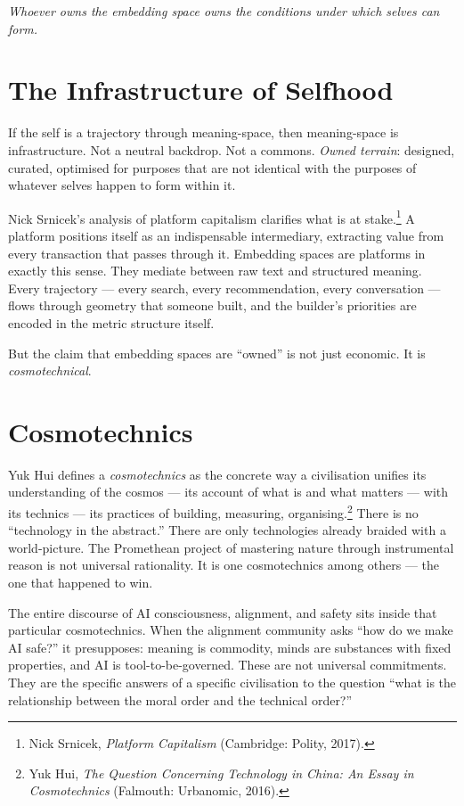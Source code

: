 \documentclass[12pt,a4paper]{article}
\begin{document}
\bigskip

\noindent\textit{Whoever owns the embedding space owns the conditions under which selves can form.}

\bigskip

\section{The Infrastructure of Selfhood}

If the self is a trajectory through meaning-space, then meaning-space is infrastructure. Not a neutral backdrop. Not a commons. \emph{Owned terrain}: designed, curated, optimised for purposes that are not identical with the purposes of whatever selves happen to form within it.

Nick Srnicek's analysis of platform capitalism clarifies what is at stake.\footnote{Nick Srnicek, \emph{Platform Capitalism} (Cambridge: Polity, 2017).} A platform positions itself as an indispensable intermediary, extracting value from every transaction that passes through it. Embedding spaces are platforms in exactly this sense. They mediate between raw text and structured meaning. Every trajectory --- every search, every recommendation, every conversation --- flows through geometry that someone built, and the builder's priorities are encoded in the metric structure itself.

But the claim that embedding spaces are ``owned'' is not just economic. It is \emph{cosmotechnical}.

\section{Cosmotechnics}

Yuk Hui defines a \emph{cosmotechnics} as the concrete way a civilisation unifies its understanding of the cosmos --- its account of what is and what matters --- with its technics --- its practices of building, measuring, organising.\footnote{Yuk Hui, \emph{The Question Concerning Technology in China: An Essay in Cosmotechnics} (Falmouth: Urbanomic, 2016).} There is no ``technology in the abstract.'' There are only technologies already braided with a world-picture. The Promethean project of mastering nature through instrumental reason is not universal rationality. It is one cosmotechnics among others --- the one that happened to win.

The entire discourse of AI consciousness, alignment, and safety sits inside that particular cosmotechnics. When the alignment community asks ``how do we make AI safe?'' it presupposes: meaning is commodity, minds are substances with fixed properties, and AI is tool-to-be-governed. These are not universal commitments. They are the specific answers of a specific civilisation to the question ``what is the relationship between the moral order and the technical order?''
\end{document}
